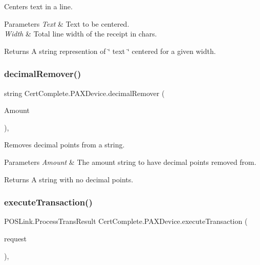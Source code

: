 Centers text in a line. 


\begin{DoxyParams}{Parameters}
{\em Text} & Text to be centered.\\
\hline
{\em Width} & Total line width of the receipt in chars.\\
\hline
\end{DoxyParams}
\begin{DoxyReturn}{Returns}
A string represention of \char`\"{}   text   \char`\"{} centered for a given width.
\end{DoxyReturn}
\mbox{\label{class_cert_complete_1_1_p_a_x_device_a18d132a18ea2c19154be3c762b7b4342}} 
\subsubsection{\texorpdfstring{decimal\+Remover()}{decimalRemover()}}
{\footnotesize\ttfamily string Cert\+Complete.\+P\+A\+X\+Device.\+decimal\+Remover (\begin{DoxyParamCaption}\item[{string}]{Amount }\end{DoxyParamCaption})\hspace{0.3cm}{\ttfamily [inline]}, {\ttfamily [private]}}



Removes decimal points from a string. 


\begin{DoxyParams}{Parameters}
{\em Amount} & The amount string to have decimal points removed from.\\
\hline
\end{DoxyParams}
\begin{DoxyReturn}{Returns}
A string with no decimal points.
\end{DoxyReturn}
\mbox{\label{class_cert_complete_1_1_p_a_x_device_a28711bc71dba66a4a6abf24e09941cbe}} 
\subsubsection{\texorpdfstring{execute\+Transaction()}{executeTransaction()}}
{\footnotesize\ttfamily P\+O\+S\+Link.\+Process\+Trans\+Result Cert\+Complete.\+P\+A\+X\+Device.\+execute\+Transaction (\begin{DoxyParamCaption}\item[{P\+O\+S\+Link.\+Payment\+Request}]{request }\end{DoxyParamCaption})\hspace{0.3cm}{\ttfamily [inline]}, {\ttfamily [private]}}







